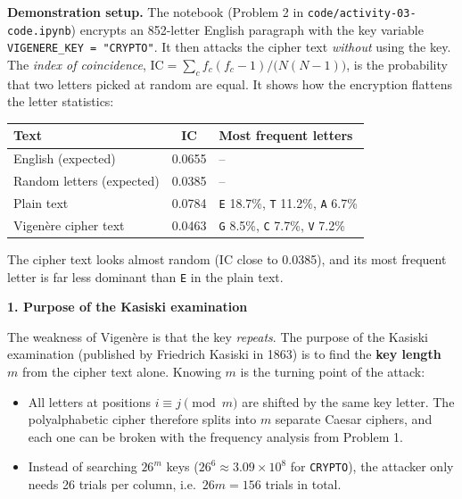 \documentclass[a4paper, 10pt]{article}
\begin{document}
\begin{problem}
\begin{subproblems_alpha}
\begin{solution}
		      \textbf{Demonstration setup.}
		      The notebook (Problem 2 in \texttt{code/activity-03-code.ipynb}) encrypts an 852-letter English paragraph with the key variable
		      \texttt{VIGENERE\_KEY = "CRYPTO"}.
		      It then attacks the cipher text \emph{without} using the key.
		      The \emph{index of coincidence}, $\mathrm{IC} = \sum_{c} f_c (f_c - 1) / \big(N(N-1)\big)$, is the probability that two letters picked at random are equal.
		      It shows how the encryption flattens the letter statistics:
		      \begin{center}
			      \footnotesize
			      \begin{tabular}{lcl}
				      \toprule
				      Text                      & IC     & Most frequent letters                                  \\
				      \midrule
				      English (expected)        & 0.0655 & --                                                     \\
				      Random letters (expected) & 0.0385 & --                                                     \\
				      Plain text                & 0.0784 & \texttt{E} 18.7\%, \texttt{T} 11.2\%, \texttt{A} 6.7\% \\
				      Vigenère cipher text      & 0.0463 & \texttt{G} 8.5\%, \texttt{C} 7.7\%, \texttt{V} 7.2\%   \\
				      \bottomrule
			      \end{tabular}
		      \end{center}
		      The cipher text looks almost random (IC close to 0.0385), and its most frequent letter is far less dominant than \texttt{E} in the plain text.

		      \par\medskip\noindent\textbf{\large 1. Purpose of the Kasiski examination}

		      The weakness of Vigenère is that the key \emph{repeats}.
		      The purpose of the Kasiski examination (published by Friedrich Kasiski in 1863) is to find the \textbf{key length $m$} from the cipher text alone.
		      Knowing $m$ is the turning point of the attack:
		      \begin{itemize}
			      \item All letters at positions $i \equiv j \pmod m$ are shifted by the same key letter.
			            The polyalphabetic cipher therefore splits into $m$ separate Caesar ciphers, and each one can be broken with the frequency analysis from Problem 1.
			      \item Instead of searching $26^m$ keys ($26^6 \approx 3.09 \times 10^8$ for \texttt{CRYPTO}),
			            the attacker only needs 26 trials per column, i.e.\ $26m = 156$ trials in total.
		      \end{itemize}


\end{solution}
\end{subproblems_alpha}
\end{problem}
\end{document}
